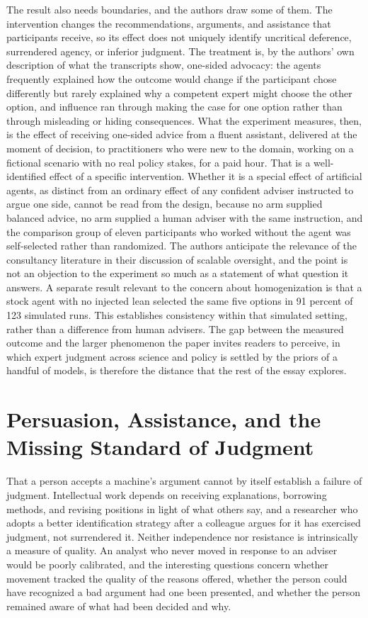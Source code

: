 \documentclass[11pt]{article}
\begin{document}
The result also needs boundaries, and the authors draw some of them. The intervention changes the recommendations, arguments, and assistance that participants receive, so its effect does not uniquely identify uncritical deference, surrendered agency, or inferior judgment. The treatment is, by the authors' own description of what the transcripts show, one-sided advocacy: the agents frequently explained how the outcome would change if the participant chose differently but rarely explained why a competent expert might choose the other option, and influence ran through making the case for one option rather than through misleading or hiding consequences. What the experiment measures, then, is the effect of receiving one-sided advice from a fluent assistant, delivered at the moment of decision, to practitioners who were new to the domain, working on a fictional scenario with no real policy stakes, for a paid hour. That is a well-identified effect of a specific intervention. Whether it is a special effect of artificial agents, as distinct from an ordinary effect of any confident adviser instructed to argue one side, cannot be read from the design, because no arm supplied balanced advice, no arm supplied a human adviser with the same instruction, and the comparison group of eleven participants who worked without the agent was self-selected rather than randomized. The authors anticipate the relevance of the consultancy literature in their discussion of scalable oversight, and the point is not an objection to the experiment so much as a statement of what question it answers. A separate result relevant to the concern about homogenization is that a stock agent with no injected lean selected the same five options in 91 percent of 123 simulated runs. This establishes consistency within that simulated setting, rather than a difference from human advisers. The gap between the measured outcome and the larger phenomenon the paper invites readers to perceive, in which expert judgment across science and policy is settled by the priors of a handful of models, is therefore the distance that the rest of the essay explores.

\section{Persuasion, Assistance, and the Missing Standard of Judgment}

That a person accepts a machine's argument cannot by itself establish a failure of judgment. Intellectual work depends on receiving explanations, borrowing methods, and revising positions in light of what others say, and a researcher who adopts a better identification strategy after a colleague argues for it has exercised judgment, not surrendered it. Neither independence nor resistance is intrinsically a measure of quality. An analyst who never moved in response to an adviser would be poorly calibrated, and the interesting questions concern whether movement tracked the quality of the reasons offered, whether the person could have recognized a bad argument had one been presented, and whether the person remained aware of what had been decided and why.
\end{document}

